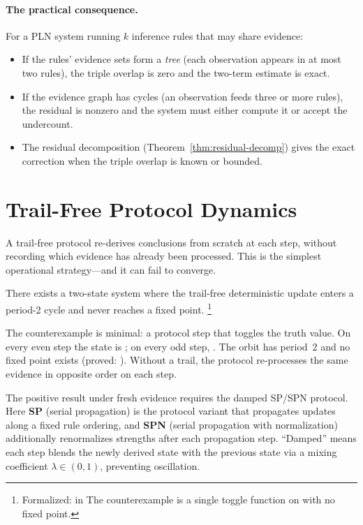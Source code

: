 \documentclass[11pt,openany]{report}
\begin{document}
\paragraph{The practical consequence.}
For a PLN system running $k$ inference rules that may share evidence:
\begin{itemize}
\item If the rules' evidence sets form a \emph{tree} (each
  observation appears in at most two rules), the triple overlap is
  zero and the two-term estimate is exact.
\item If the evidence graph has cycles (an observation feeds three or
  more rules), the residual is nonzero and the system must either
  compute it or accept the undercount.
\item The residual decomposition
  (Theorem~\ref{thm:residual-decomp}) gives the exact correction
  when the triple overlap is known or bounded.
\end{itemize}


\section{Trail-Free Protocol Dynamics}
\label{sec:trail-free}

A trail-free protocol re-derives conclusions from scratch at each
step, without recording which evidence has already been processed.
This is the simplest operational strategy---and it can fail to
converge.

\begin{theorem}
\label{thm:trail-free-no-go}
There exists a two-state system where the trail-free deterministic
update enters a period-2 cycle and never reaches a fixed point.%
\footnote{Formalized:
in 
  The counterexample is a single toggle function on
 with no fixed point.}
\end{theorem}

\noindent
The counterexample is minimal: a protocol step that toggles the
truth value.  On every even step the state is ; on every
odd step, .  The orbit has period~2 and no fixed point
exists (proved: ).  Without a trail, the
protocol re-processes the same evidence in opposite order on each
step.

The positive result under fresh evidence requires the damped SP/SPN
protocol.  Here \textbf{SP} (serial propagation) is the protocol
variant that propagates updates along a fixed rule ordering, and
\textbf{SPN} (serial propagation with normalization) additionally
renormalizes strengths after each propagation step.  ``Damped'' means
each step blends the newly derived state with the previous state via
a mixing coefficient $\lambda \in (0, 1)$, preventing oscillation.
\end{document}
